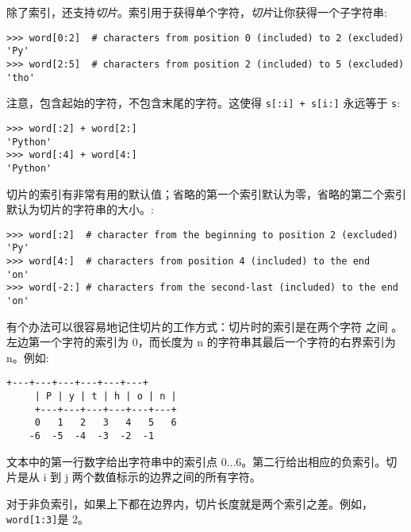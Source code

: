 除了索引，还支持\emph{切片}。索引用于获得单个字符，\emph{切片}让你获得一个子字符串:
\begin{lstlisting}
>>> word[0:2]  # characters from position 0 (included) to 2 (excluded)
'Py'
>>> word[2:5]  # characters from position 2 (included) to 5 (excluded)
'tho'
\end{lstlisting}
注意，包含起始的字符，不包含末尾的字符。这使得 \texttt{s[:i] + s[i:]} 永远等于 \verb|s|:
\begin{lstlisting}
>>> word[:2] + word[2:]
'Python'
>>> word[:4] + word[4:]
'Python'
\end{lstlisting}
切片的索引有非常有用的默认值；省略的第一个索引默认为零，省略的第二个索引默认为切片的字符串的大小。:
\begin{lstlisting}
>>> word[:2]  # character from the beginning to position 2 (excluded)
'Py'
>>> word[4:]  # characters from position 4 (included) to the end
'on'
>>> word[-2:] # characters from the second-last (included) to the end
'on'
\end{lstlisting}
有个办法可以很容易地记住切片的工作方式：切片时的索引是在两个字符 之间 。左边第一个字符的索引为 0，而长度为 n 的字符串其最后一个字符的右界索引为 n。例如:
\begin{Verbatim}[fontfamily=tt]
     +---+---+---+---+---+---+
     | P | y | t | h | o | n |
     +---+---+---+---+---+---+
     0   1   2   3   4   5   6
    -6  -5  -4  -3  -2  -1
\end{Verbatim}
文本中的第一行数字给出字符串中的索引点 0...6。第二行给出相应的负索引。切片是从 i 到 j 两个数值标示的边界之间的所有字符。

对于非负索引，如果上下都在边界内，切片长度就是两个索引之差。例如，\texttt{word[1:3]}是 2。

